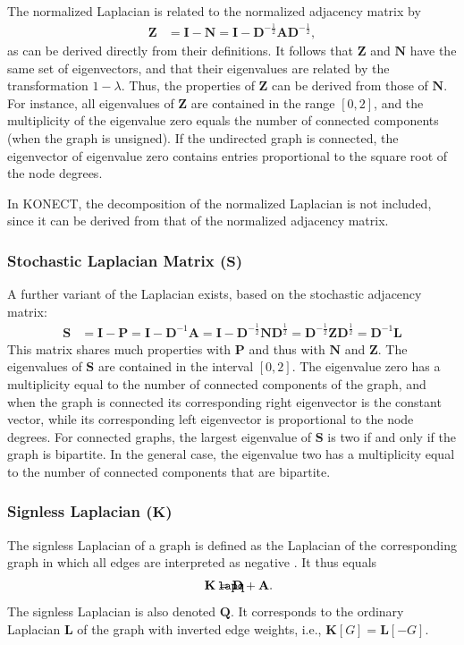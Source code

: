 \documentclass{article}
\def\mathnote#1{%
  \tag*{\rlap{\hspace\marginparsep\smash{\parbox[t]{\marginparwidth}{#1}}}}
}
\begin{document}
The normalized Laplacian is related to the normalized adjacency matrix
by 
\begin{align}
  \mathbf Z &= \mathbf I - \mathbf N = \mathbf I - \mathbf D^{-\frac 1 2}
  \mathbf A \mathbf D^{-\frac 1 2}, 
\end{align}
as can be derived directly from their definitions. 
It follows that $\mathbf Z$ and $\mathbf N$ have the same set of
eigenvectors, and that their eigenvalues are related by the
transformation $1 - \lambda$. Thus, the properties of $\mathbf Z$ can be
derived from those of $\mathbf N$. For instance, all eigenvalues of
$\mathbf Z$ are contained in the range $[0, 2]$, and the multiplicity of
the eigenvalue zero equals the number of connected components (when the
graph is unsigned). If the undirected graph is connected, the eigenvector of
eigenvalue zero contains entries proportional to the square root of the
node degrees. 

In KONECT, the decomposition of the normalized Laplacian is not
included, since it can be derived from that of the normalized adjacency
matrix. 

\subsubsection{Stochastic Laplacian Matrix ($\mathbf S$)}
\label{sec:matrix.S}
A further variant of the Laplacian exists, based on the stochastic
adjacency matrix:
\begin{align}
  \mathbf S &= \mathbf I - \mathbf P = \mathbf I - \mathbf D^{-1}
  \mathbf A = \mathbf I - \mathbf D^{-\frac 1 2} \mathbf N \mathbf D^{\frac 1 2} =
  \mathbf D^{-\frac 1 2} \mathbf Z \mathbf D^{\frac 1 2}
  = \mathbf D^{-1} \mathbf L
\end{align}
This matrix shares much properties with $\mathbf P$ and thus with
$\mathbf N$ and $\mathbf Z$.  The eigenvalues of $\mathbf S$ are
contained in the interval $[0, 2]$.  The eigenvalue zero has a
multiplicity equal to the number of connected components of the graph,
and when the graph is connected its corresponding right eigenvector is the
constant vector, while its corresponding left eigenvector is
proportional to the node degrees.  For connected graphs, the largest
eigenvalue of $\mathbf S$ is two if and only if the graph is bipartite.
In the general case, the eigenvalue two has a multiplicity equal to the
number of connected components that are bipartite. 

\subsubsection{Signless Laplacian ($\mathbf K$)}
\label{sec:signless-laplacian}
\label{sec:matrix.K}
\label{sec:matrix.C}
\label{sec:matrix.J}
The signless Laplacian of a graph is defined as the Laplacian of the
corresponding graph in which all edges are interpreted as negative \citep{b900}.  It
thus equals
\begin{align}
  \mathnote{\texttt{lapq}}
  \mathbf K &= \mathbf D + \mathbf A.
\end{align}
The signless Laplacian is also denoted $\mathbf Q$. 
It corresponds to the ordinary Laplacian
$\mathbf L$ of the graph with inverted edge weights, i.e., $\mathbf K[G] =
\mathbf L[-G]$. 
\end{document}
